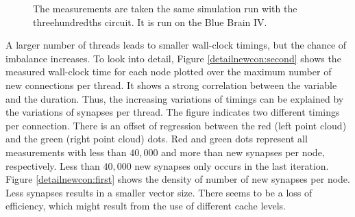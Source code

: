 \begin{figure}[ht!]
     \begin{center}
        \hspace{0.2cm}
    \end{center}
    \caption{%
        The measurements are taken the same simulation run with the threehundredths circuit. It is run on the Blue Brain IV.
     }%
   \label{detailnewcon}
\end{figure}

A larger number of threads leads to smaller wall-clock timings, but the chance of imbalance increases.
To look into detail, Figure \ref{detailnewcon:second} shows the measured wall-clock time for each node
plotted over the maximum number of new connections per thread. It shows a strong correlation between the variable and
the duration. Thus, the increasing variations of timings can be explained by the variations of synapses per thread.
The figure indicates two different timings per connection. There is an offset of regression between the red
(left point cloud)
and the green (right point cloud) dots. Red and green dots represent all measurements with less than $40,000$ and more than new synapses per
node, respectively. Less than $40,000$ new synapses only occurs in the last iteration.
Figure \ref{detailnewcon:first} shows the density of number of new synapses per node.
Less synapses results in a smaller vector size. There seems to be a loss of efficiency, which might result from
the use of different cache levels.

